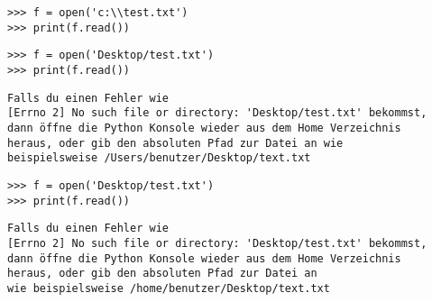 \begin{WINDOWS}

\begin{Verbatim}[frame=single]
>>> f = open('c:\\test.txt')
>>> print(f.read())
\end{Verbatim}

\end{WINDOWS}

\begin{MAC}

\begin{Verbatim}[frame=single]
>>> f = open('Desktop/test.txt')
>>> print(f.read())
\end{Verbatim}

\begin{Verbatim}[frame=single, label=eventueller Fehler]
Falls du einen Fehler wie
[Errno 2] No such file or directory: 'Desktop/test.txt' bekommst,
dann öffne die Python Konsole wieder aus dem Home Verzeichnis
heraus, oder gib den absoluten Pfad zur Datei an wie
beispielsweise /Users/benutzer/Desktop/text.txt
\end{Verbatim}

\end{MAC}

\begin{LINUX}

\begin{Verbatim}[frame=single]
>>> f = open('Desktop/test.txt')
>>> print(f.read())
\end{Verbatim}

\begin{Verbatim}[frame=single, label=eventueller Fehler]
Falls du einen Fehler wie
[Errno 2] No such file or directory: 'Desktop/test.txt' bekommst,
dann öffne die Python Konsole wieder aus dem Home Verzeichnis
heraus, oder gib den absoluten Pfad zur Datei an
wie beispielsweise /home/benutzer/Desktop/text.txt
\end{Verbatim}

\end{LINUX}

